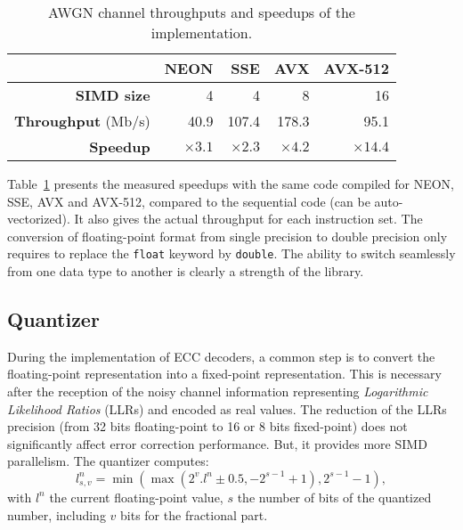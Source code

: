 \begin{table}[htp]
  \centering
  \caption{AWGN channel throughputs and speedups of the \MIPP implementation.}
  \label{lst:opt_simu_awgn_speedup}
  \begin{tabular}{r | r  r r r}
                             & \textbf{NEON} & \textbf{SSE} & \textbf{AVX} & \textbf{AVX-512} \\ \hline \hline
  \textbf{SIMD size}         & 4             & 4            & 8            & 16               \\ %
  \textbf{Throughput} (Mb/s) & 40.9          & 107.4        & 178.3        & 95.1             \\ %
  \textbf{Speedup}           & $\times 3.1$  & $\times 2.3$ & $\times 4.2$ & $\times 14.4$    \\
  \end{tabular}
\end{table}

\newpage
Table~\ref{lst:opt_simu_awgn_speedup} presents the measured speedups with the
same \MIPP code compiled for NEON, SSE, AVX and AVX-512, compared to the
sequential code (can be auto-vectorized). It also gives the actual throughput
for each instruction set. The conversion of floating-point format from single
precision to double precision only requires to replace the \verb|float| keyword
by \verb|double|. The ability to switch seamlessly from one data type to another
is clearly a strength of the \MIPP library.

\subsection{Quantizer}
\label{sec:opt_simu_quantizer}

During the implementation of ECC decoders, a common step is to convert the
floating-point representation into a fixed-point representation. This is
necessary after the reception of the noisy channel information representing
\textit{Logarithmic Likelihood Ratios} (LLRs) and encoded as real values. The
reduction of the LLRs precision (from 32 bits floating-point to 16 or 8 bits
fixed-point) does not significantly affect error correction performance. But, it
provides more SIMD parallelism. The quantizer computes:
\begin{equation}
\label{eq:opt_simu_quantizer}
l_{s,v}^n = \min(\max(2^v . l^n \pm 0.5, -2^{s-1} +1), 2^{s-1} -1),
\end{equation}
with $l^n$ the current floating-point value, $s$ the number of bits of the
quantized number, including $v$ bits for the fractional part.

